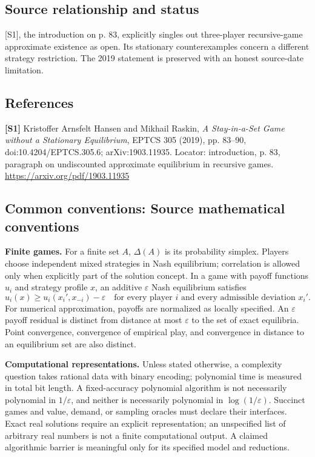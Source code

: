 \documentclass[11pt,a4paper]{article}
\begin{document}
\subsection*{Source relationship and status}
[S1], the introduction on p. 83, explicitly singles out three-player recursive-game approximate existence as open. Its stationary counterexamples concern a different strategy restriction. The 2019 statement is preserved with an honest source-date limitation.
\subsection*{References}
\begingroup\footnotesize\raggedright
\textbf{[S1]} Kristoffer Arnsfelt Hansen and Mikhail Raskin, \emph{A Stay-in-a-Set Game without a Stationary Equilibrium}, EPTCS 305 (2019), pp. 83--90, doi:10.4204/EPTCS.305.6; arXiv:1903.11935. Locator: introduction, p. 83, paragraph on undiscounted approximate equilibrium in recursive games. \url{https://arxiv.org/pdf/1903.11935}
\par\endgroup

\subsection*{Common conventions: Source mathematical conventions}

\textbf{Finite games.} For a finite set $A$, $\Delta(A)$ is its probability
simplex. Players choose independent mixed strategies in Nash equilibrium;
correlation is allowed only when explicitly part of the solution concept.
In a game with payoff functions $u_i$ and strategy profile $x$, an additive
$\varepsilon$ Nash equilibrium satisfies
\[
 u_i(x)\geq u_i(x_i',x_{-i})-\varepsilon
 \quad\text{for every player $i$ and every admissible deviation $x_i'$}.
\]
For numerical approximation, payoffs are normalized as locally specified.
An $\varepsilon$ payoff residual is distinct from distance at most
$\varepsilon$ to the set of exact equilibria. Point convergence, convergence
of empirical play, and convergence in distance to an equilibrium set are
also distinct.

\textbf{Computational representations.} Unless stated otherwise, a complexity
question takes rational data with binary encoding; polynomial time is measured
in total bit length. A fixed-accuracy polynomial algorithm is not necessarily
polynomial in $1/\varepsilon$, and neither is necessarily polynomial in
$\log(1/\varepsilon)$. Succinct games and value, demand, or sampling oracles
must declare their interfaces. Exact real solutions require an explicit
representation; an unspecified list of arbitrary real numbers is not a
finite computational output. A claimed algorithmic barrier is meaningful
only for its specified model and reductions.
\end{document}
